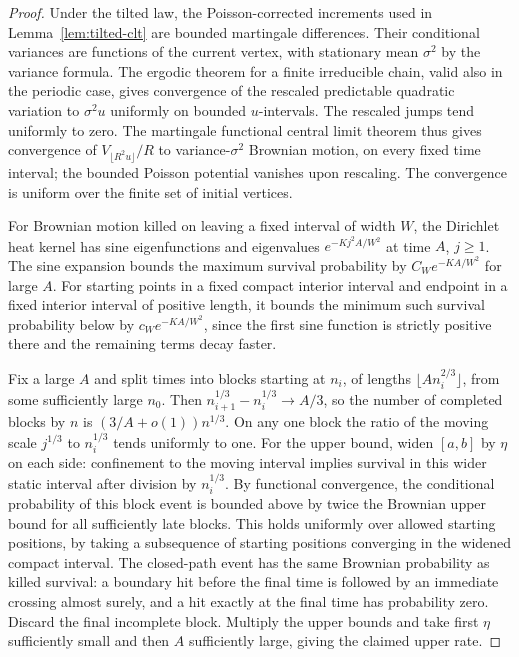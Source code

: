 \documentclass[11pt]{article}
\theoremstyle{definition}
\theoremstyle{remark}
\begin{document}
\begin{proof}
Under the tilted law, the Poisson-corrected increments used in
Lemma~\ref{lem:tilted-clt} are bounded martingale differences.
Their conditional variances are functions of the current vertex,
with stationary mean $\sigma^2$ by the variance formula.
The ergodic theorem for a finite irreducible chain, valid also
in the periodic case, gives convergence of the rescaled
predictable quadratic variation to $\sigma^2 u$ uniformly
on bounded $u$-intervals. The rescaled jumps tend uniformly
to zero. The martingale functional central limit theorem
\cite[Theorem~2.1(ii)]{WhittFCLT} thus gives convergence of
$V_{\lfloor R^2 u\rfloor}/R$ to variance-$\sigma^2$ Brownian
motion, on every fixed time interval; the bounded Poisson
potential vanishes upon rescaling. The convergence is uniform
over the finite set of initial vertices.

For Brownian motion killed on leaving a fixed interval of
width $W$, the Dirichlet heat kernel has sine eigenfunctions
and eigenvalues $e^{-Kj^2 A/W^2}$ at time $A$, $j\ge1$.
The sine expansion bounds the maximum survival probability
by $C_W e^{-KA/W^2}$ for large $A$.
For starting points in a fixed compact interior interval
and endpoint in a fixed interior interval of positive length,
it bounds the minimum such survival probability below by
$c_W e^{-KA/W^2}$, since the first sine function is
strictly positive there and the remaining terms decay faster.

Fix a large $A$ and split times into blocks starting at $n_i$,
of lengths $\lfloor A n_i^{2/3}\rfloor$, from some sufficiently
large $n_0$. Then $n_{i+1}^{1/3}-n_i^{1/3}\to A/3$,
so the number of completed blocks by $n$ is
$(3/A+o(1))n^{1/3}$. On any one block the ratio of the
moving scale $j^{1/3}$ to $n_i^{1/3}$ tends uniformly to one.
For the upper bound, widen $[a,b]$ by $\eta$ on each side:
confinement to the moving interval implies survival in this
wider static interval after division by $n_i^{1/3}$.
By functional convergence, the conditional probability of this
block event is bounded above by twice the Brownian upper bound
for all sufficiently late blocks. This holds uniformly over
allowed starting positions, by taking a subsequence of
starting positions converging in the widened compact interval.
The closed-path event has the same Brownian probability as
killed survival: a boundary hit before the final time is
followed by an immediate crossing almost surely, and a hit
exactly at the final time has probability zero.
Discard the final incomplete block. Multiply the upper bounds
and take first $\eta$ sufficiently small and then $A$
sufficiently large, giving the claimed upper rate.


\end{proof}
\end{document}
